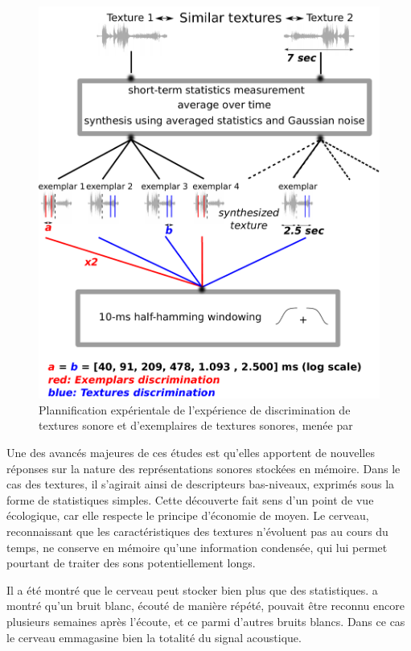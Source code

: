 \begin{figure}[bth]
        \myfloatalign
        \includegraphics[width=\linewidth]{gfx/mcder}
        \caption[Plannification expérientale de l'expérience de discrimination de textures sonore et d'exemplaires de textures sonores]{Plannification expérientale de l'expérience de discrimination de textures sonore et d'exemplaires de textures sonores, menée par \citep{mcdermott2013summary}}\label{fig:textureMcder}
\end{figure}

Une des avancés majeures de ces études est qu'elles apportent de nouvelles réponses sur la nature des représentations sonores stockées en mémoire. Dans le cas des textures, il s'agirait ainsi de descripteurs bas-niveaux, exprimés sous la forme de statistiques simples. Cette découverte fait sens d'un point de vue écologique, car elle respecte le principe d'économie de moyen. Le cerveau, reconnaissant que les caractéristiques des textures n'évoluent pas au cours du temps, ne conserve en mémoire qu'une information condensée, qui lui permet pourtant de traiter des sons potentiellement longs. 

Il a été montré que le cerveau peut stocker bien plus que des statistiques.  \citep{agus2010rapid} a montré qu'un bruit blanc, écouté de manière répété, pouvait être reconnu encore plusieurs semaines après l'écoute, et ce parmi d'autres bruits blancs. Dans ce cas le cerveau emmagasine bien la totalité du signal acoustique.

